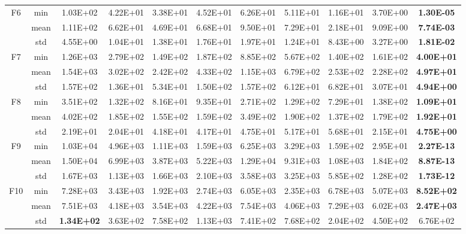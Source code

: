 \documentclass[preprint,review,compress,12pt]{elsarticle}
\begin{document}
\begin{table}[H]
{\begin{tabular}{ccccccccccc}
    \multirow{3}[0]{*}{F6} & min   & 1.03E+02 & 4.22E+01 & 3.38E+01 & 4.52E+01 & 6.26E+01 & 5.11E+01 & 1.16E+01 & 3.70E+00 & \textbf{1.30E-05} \\
          & mean  & 1.11E+02 & 6.62E+01 & 4.69E+01 & 6.68E+01 & 9.50E+01 & 7.29E+01 & 2.18E+01 & 9.09E+00 & \textbf{7.74E-03} \\
          & std   & 4.55E+00 & 1.04E+01 & 1.38E+01 & 1.76E+01 & 1.97E+01 & 1.24E+01 & 8.43E+00 & 3.27E+00 & \textbf{1.81E-02} \\
    \multirow{3}[0]{*}{F7} & min   & 1.26E+03 & 2.79E+02 & 1.49E+02 & 1.87E+02 & 8.85E+02 & 5.67E+02 & 1.40E+02 & 1.61E+02 & \textbf{4.00E+01} \\
          & mean  & 1.54E+03 & 3.02E+02 & 2.42E+02 & 4.33E+02 & 1.15E+03 & 6.79E+02 & 2.53E+02 & 2.28E+02 & \textbf{4.97E+01} \\
          & std   & 1.57E+02 & 1.36E+01 & 5.34E+01 & 1.50E+02 & 1.57E+02 & 6.12E+01 & 6.82E+01 & 3.07E+01 & \textbf{4.94E+00} \\
    \multirow{3}[0]{*}{F8} & min   & 3.51E+02 & 1.32E+02 & 8.16E+01 & 9.35E+01 & 2.71E+02 & 1.29E+02 & 7.29E+01 & 1.38E+02 & \textbf{1.09E+01} \\
          & mean  & 4.02E+02 & 1.85E+02 & 1.55E+02 & 1.59E+02 & 3.49E+02 & 1.90E+02 & 1.37E+02 & 1.79E+02 & \textbf{1.92E+01} \\
          & std   & 2.19E+01 & 2.04E+01 & 4.18E+01 & 4.17E+01 & 4.75E+01 & 5.17E+01 & 5.68E+01 & 2.15E+01 & \textbf{4.75E+00} \\
    \multirow{3}[0]{*}{F9} & min   & 1.03E+04 & 4.96E+03 & 1.11E+03 & 1.59E+03 & 6.25E+03 & 3.29E+03 & 1.59E+02 & 2.95E+01 & \textbf{2.27E-13} \\
          & mean  & 1.50E+04 & 6.99E+03 & 3.87E+03 & 5.22E+03 & 1.29E+04 & 9.31E+03 & 1.08E+03 & 1.84E+02 & \textbf{8.87E-13} \\
          & std   & 1.67E+03 & 1.13E+03 & 1.66E+03 & 2.10E+03 & 3.58E+03 & 3.25E+03 & 5.85E+02 & 1.28E+02 & \textbf{1.73E-12} \\
    \multirow{3}[0]{*}{F10} & min   & 7.28E+03 & 3.43E+03 & 1.92E+03 & 2.74E+03 & 6.05E+03 & 2.35E+03 & 6.78E+03 & 5.07E+03 & \textbf{8.52E+02} \\
          & mean  & 7.51E+03 & 4.18E+03 & 3.54E+03 & 4.22E+03 & 7.54E+03 & 4.06E+03 & 7.29E+03 & 6.02E+03 & \textbf{2.47E+03} \\
          & std   & \textbf{1.34E+02} & 3.63E+02 & 7.58E+02 & 1.13E+03 & 7.41E+02 & 7.68E+02 & 2.04E+02 & 4.50E+02 & 6.76E+02 \\

\end{tabular}}
\end{table}
\end{document}
